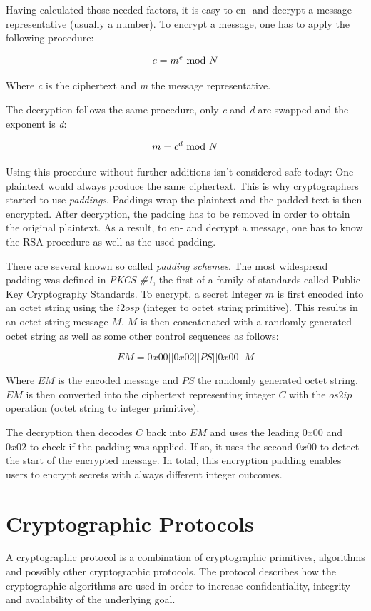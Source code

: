 Having calculated those needed factors, it is easy to en- and decrypt
a message representative (usually a number). To encrypt a message, one
has to apply the following procedure:

$$c = m^e \ \text{mod}\ N$$

Where \textit{c} is the ciphertext and \textit{m} the message representative.

The decryption follows the same procedure, only \textit{c} and \textit{d} are
swapped and the exponent is \textit{d}:

$$m = c^d \ \text{mod}\ N$$

Using this procedure without further additions isn't considered safe today:
One plaintext would always produce the same ciphertext. This is why cryptographers
started to use \textit{paddings}. Paddings wrap the plaintext and the padded
text is then encrypted. After decryption, the padding has to be removed in order
to obtain the original plaintext. As a result, to en- and decrypt a message, one
has to know the RSA procedure as well as the used padding.

There are several known so called \textit{padding schemes}. The most widespread
padding was defined in \textit{PKCS \#1}, the first of a family of standards
called Public Key Cryptography Standards. To encrypt, a secret Integer $m$ is 
first encoded into an octet string using the $i2osp$ (integer to octet string 
primitive). This results in an octet string message $M$. $M$ is then
concatenated with a randomly generated octet string as well as some other control
sequences as follows:

$$EM = 0x00 || 0x02 || PS || 0x00 || M$$

Where $EM$ is the encoded message and $PS$ the randomly generated octet string.
$EM$ is then converted into the ciphertext representing integer $C$ with the $os2ip$
operation (octet string to integer primitive).

The decryption then decodes $C$ back into $EM$ and 
uses the leading $0x00$ and $0x02$ to check if the padding was
applied. If so, it uses the second $0x00$ to detect the start of the encrypted
message. In total, this encryption padding enables users to encrypt secrets with
always different integer outcomes.

\section{Cryptographic Protocols}

A cryptographic protocol is a combination of cryptographic primitives,
algorithms and possibly other cryptographic protocols. The protocol describes
how the cryptographic algorithms are used in order to increase confidentiality,
integrity and availability of the underlying goal.

